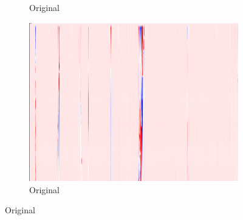 \begin{figure}[h]
\begin{subfigure}{0.33\textwidth}
        \caption{Original}
    \end{subfigure}%
    \hfill
    \begin{subfigure}{0.33\textwidth}
        \includegraphics[width=\textwidth]{figures/test.png}
        \caption{Original}
    \end{subfigure}
    
    \vspace{1em}
    

\end{figure}
